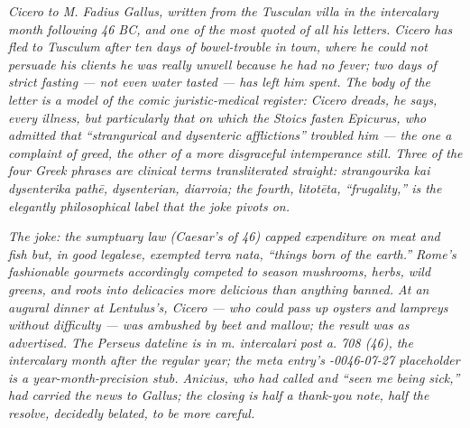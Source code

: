 
\textit{Cicero to M. Fadius Gallus, written from the Tusculan villa
in the intercalary month following 46 BC, and one of the most
quoted of all his letters. Cicero has fled to Tusculum after ten
days of bowel-trouble in town, where he could not persuade his
clients he was really unwell because he had no fever; two days of
strict fasting --- not even water tasted --- has left him spent.
The body of the letter is a model of the comic juristic-medical
register: Cicero dreads, he says, every illness, but particularly
that on which the Stoics fasten Epicurus, who admitted that
``strangurical and dysenteric afflictions'' troubled him --- the
one a complaint of greed, the other of a more disgraceful
intemperance still. Three of the four Greek phrases are clinical
terms transliterated straight: \textit{strangourika kai dysenterika
pathē}, \textit{dysenterian}, \textit{diarroia}; the fourth,
\textit{litotēta}, ``frugality,'' is the elegantly philosophical
label that the joke pivots on.}

\textit{The joke: the sumptuary law (Caesar's of 46) capped
expenditure on meat and fish but, in good legalese, exempted
\textit{terra nata}, ``things born of the earth.'' Rome's
fashionable gourmets accordingly competed to season mushrooms,
herbs, wild greens, and roots into delicacies more delicious than
anything banned. At an augural dinner at Lentulus's, Cicero ---
who could pass up oysters and lampreys without difficulty --- was
ambushed by beet and mallow; the result was as advertised. The
Perseus dateline is \textit{in m. intercalari post a. 708 (46)},
the intercalary month after the regular year; the meta entry's
\textit{-0046-07-27} placeholder is a year-month-precision stub.
Anicius, who had called and ``seen me being sick,'' had carried
the news to Gallus; the closing is half a thank-you note, half
the resolve, decidedly belated, to be more careful.}

